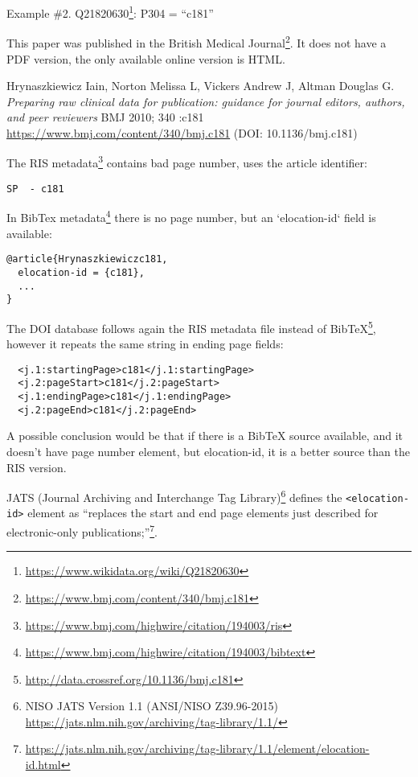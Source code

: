 Example \#2. Q21820630\footnote{\url{https://www.wikidata.org/wiki/Q21820630}}: P304 = ``c181''

This paper was published in the British Medical Journal\footnote{\url{https://www.bmj.com/content/340/bmj.c181}}. It does not have a PDF version, the only available online version is HTML.

Hrynaszkiewicz Iain, Norton Melissa L, Vickers Andrew J, Altman Douglas G. \emph{Preparing raw clinical data for publication: guidance for journal editors, authors, and peer reviewers} BMJ 2010; 340 :c181 \url{https://www.bmj.com/content/340/bmj.c181} (DOI: 10.1136/bmj.c181)

The RIS metadata\footnote{\url{https://www.bmj.com/highwire/citation/194003/ris}} contains bad page number, uses the article identifier:

\begin{lstlisting}
SP  - c181
\end{lstlisting}

In BibTex metadata\footnote{\url{https://www.bmj.com/highwire/citation/194003/bibtext}} there is no page number, but an `elocation-id` field is available:
\begin{lstlisting}
@article{Hrynaszkiewiczc181,
  elocation-id = {c181},
  ...
}
\end{lstlisting}

The DOI database follows again the RIS metadata file instead of BibTeX\footnote{\url{http://data.crossref.org/10.1136/bmj.c181}}, however it repeats the same string in ending page fields:

\begin{lstlisting}
  <j.1:startingPage>c181</j.1:startingPage>
  <j.2:pageStart>c181</j.2:pageStart>
  <j.1:endingPage>c181</j.1:endingPage>
  <j.2:pageEnd>c181</j.2:pageEnd>
\end{lstlisting}

A possible conclusion would be that if there is a BibTeX source available, and it doesn't have page number element, but elocation-id, it is a better source than the RIS version. 

JATS (Journal Archiving and Interchange Tag Library)\footnote{NISO JATS Version 1.1 (ANSI/NISO Z39.96-2015) \url{https://jats.nlm.nih.gov/archiving/tag-library/1.1/}} defines the \texttt{<elocation-id>} element as ``replaces the start and end page elements just described for electronic-only publications;''\footnote{\url{https://jats.nlm.nih.gov/archiving/tag-library/1.1/element/elocation-id.html}}.

